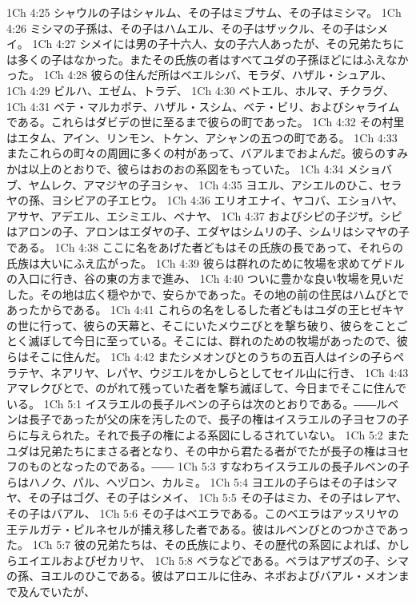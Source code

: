 1Ch 4:25  シャウルの子はシャルム、その子はミブサム、その子はミシマ。
1Ch 4:26  ミシマの子孫は、その子はハムエル、その子はザックル、その子はシメイ。
1Ch 4:27  シメイには男の子十六人、女の子六人あったが、その兄弟たちには多くの子はなかった。またその氏族の者はすべてユダの子孫ほどにはふえなかった。
1Ch 4:28  彼らの住んだ所はベエルシバ、モラダ、ハザル・シュアル、
1Ch 4:29  ビルハ、エゼム、トラデ、
1Ch 4:30  ベトエル、ホルマ、チクラグ、
1Ch 4:31  ベテ・マルカボテ、ハザル・スシム、ベテ・ビリ、およびシャライムである。これらはダビデの世に至るまで彼らの町であった。
1Ch 4:32  その村里はエタム、アイン、リンモン、トケン、アシャンの五つの町である。
1Ch 4:33  またこれらの町々の周囲に多くの村があって、バアルまでおよんだ。彼らのすみかは以上のとおりで、彼らはおのおの系図をもっていた。
1Ch 4:34  メショバブ、ヤムレク、アマジヤの子ヨシャ、
1Ch 4:35  ヨエル、アシエルのひこ、セラヤの孫、ヨシビアの子エヒウ。
1Ch 4:36  エリオエナイ、ヤコバ、エショハヤ、アサヤ、アデエル、エシミエル、ベナヤ、
1Ch 4:37  およびシピの子ジザ。シピはアロンの子、アロンはエダヤの子、エダヤはシムリの子、シムリはシマヤの子である。
1Ch 4:38  ここに名をあげた者どもはその氏族の長であって、それらの氏族は大いにふえ広がった。
1Ch 4:39  彼らは群れのために牧場を求めてゲドルの入口に行き、谷の東の方まで進み、
1Ch 4:40  ついに豊かな良い牧場を見いだした。その地は広く穏やかで、安らかであった。その地の前の住民はハムびとであったからである。
1Ch 4:41  これらの名をしるした者どもはユダの王ヒゼキヤの世に行って、彼らの天幕と、そこにいたメウニびとを撃ち破り、彼らをことごとく滅ぼして今日に至っている。そこには、群れのための牧場があったので、彼らはそこに住んだ。
1Ch 4:42  またシメオンびとのうちの五百人はイシの子らペラテヤ、ネアリヤ、レパヤ、ウジエルをかしらとしてセイル山に行き、
1Ch 4:43  アマレクびとで、のがれて残っていた者を撃ち滅ぼして、今日までそこに住んでいる。
1Ch 5:1  イスラエルの長子ルベンの子らは次のとおりである。――ルベンは長子であったが父の床を汚したので、長子の権はイスラエルの子ヨセフの子らに与えられた。それで長子の権による系図にしるされていない。
1Ch 5:2  またユダは兄弟たちにまさる者となり、その中から君たる者がでたが長子の権はヨセフのものとなったのである。――
1Ch 5:3  すなわちイスラエルの長子ルベンの子らはハノク、パル、ヘヅロン、カルミ。
1Ch 5:4  ヨエルの子らはその子はシマヤ、その子はゴグ、その子はシメイ、
1Ch 5:5  その子はミカ、その子はレアヤ、その子はバアル、
1Ch 5:6  その子はベエラである。このベエラはアッスリヤの王テルガテ・ピルネセルが捕え移した者である。彼はルベンびとのつかさであった。
1Ch 5:7  彼の兄弟たちは、その氏族により、その歴代の系図によれば、かしらエイエルおよびゼカリヤ、
1Ch 5:8  ベラなどである。ベラはアザズの子、シマの孫、ヨエルのひこである。彼はアロエルに住み、ネボおよびバアル・メオンまで及んでいたが、
